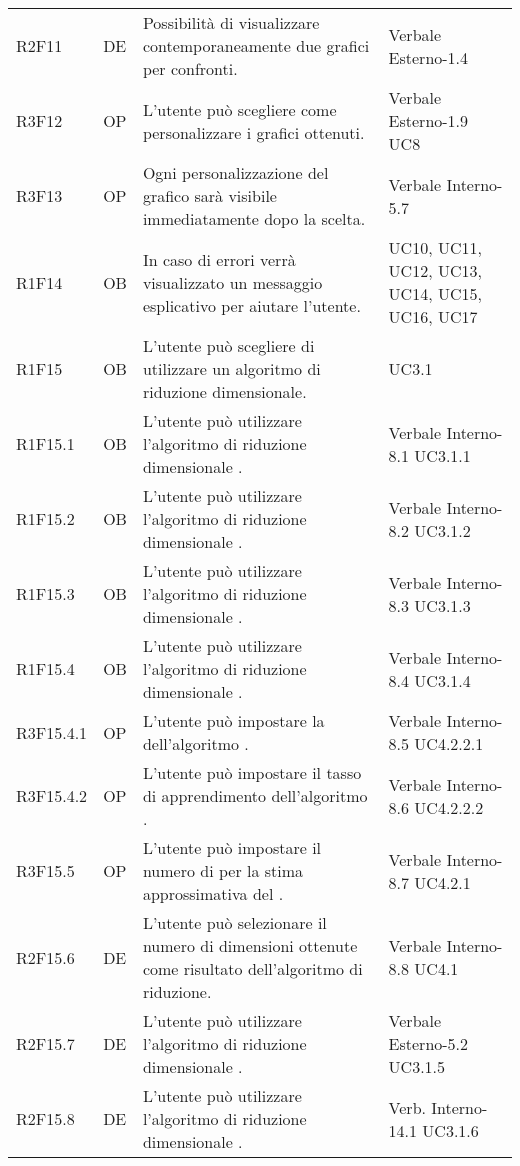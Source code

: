 {\begin{longtable}{C{2cm} | C{1.5cm} | C{9cm} | C{3.3cm}}
R2F11 & DE & Possibilità di visualizzare contemporaneamente due grafici per confronti. & Verbale Esterno-1.4\\
R3F12 & OP & L'utente può scegliere come personalizzare i grafici ottenuti. & Verbale Esterno-1.9 \newline UC8 \\
R3F13 & OP & Ogni personalizzazione del grafico sarà visibile immediatamente dopo la scelta. & Verbale Interno-5.7 \\
R1F14 & OB & In caso di errori verrà visualizzato un messaggio esplicativo per aiutare l'utente. & UC10, UC11, UC12, UC13, UC14, UC15, UC16, UC17\\
R1F15 & OB & L'utente può scegliere di utilizzare un algoritmo di riduzione dimensionale. & UC3.1 \\
R1F15.1 & OB & L'utente può utilizzare l'algoritmo di riduzione dimensionale . & Verbale Interno-8.1 \newline UC3.1.1 \\
R1F15.2 & OB & L'utente può utilizzare l'algoritmo di riduzione dimensionale . & Verbale Interno-8.2 \newline UC3.1.2\\
R1F15.3 & OB & L'utente può utilizzare l'algoritmo di riduzione dimensionale . & Verbale Interno-8.3 \newline UC3.1.3\\
R1F15.4 & OB & L'utente può utilizzare l'algoritmo di riduzione dimensionale . & Verbale Interno-8.4 \newline UC3.1.4\\
R3F15.4.1 & OP & L'utente può impostare la  dell'algoritmo . & Verbale Interno-8.5 \newline UC4.2.2.1\\
R3F15.4.2 & OP & L'utente può impostare il tasso di apprendimento dell'algoritmo . & Verbale Interno-8.6 \newline UC4.2.2.2\\
R3F15.5 & OP & L'utente può impostare il numero di  per la stima approssimativa del . & Verbale Interno-8.7 \newline UC4.2.1\\
R2F15.6 & DE & L'utente può selezionare il numero di dimensioni ottenute come risultato dell'algoritmo di riduzione. & Verbale Interno-8.8 \newline UC4.1\\
R2F15.7 & DE & L'utente può utilizzare l'algoritmo di riduzione dimensionale . & Verbale Esterno-5.2 \newline UC3.1.5\\
R2F15.8 & DE & L'utente può utilizzare l'algoritmo di riduzione dimensionale . & Verb. Interno-14.1 \newline UC3.1.6\\


\end{longtable}}
